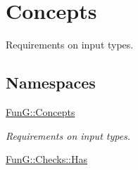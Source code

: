 \hypertarget{group__ConceptGroup}{\section{Concepts}
\label{group__ConceptGroup}
}


Requirements on input types.  


\subsection*{Namespaces}
\begin{DoxyCompactItemize}
\item 
\hyperlink{namespaceFunG_1_1Concepts}{Fun\-G\-::\-Concepts}
\begin{DoxyCompactList}\small\item\em Requirements on input types. \end{DoxyCompactList}\item 
\hyperlink{namespaceFunG_1_1Checks_1_1Has}{Fun\-G\-::\-Checks\-::\-Has}
\end{DoxyCompactItemize}

